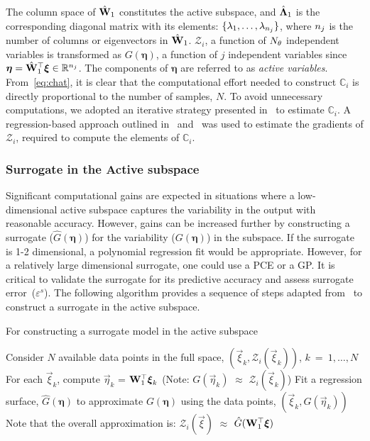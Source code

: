 \ee
%
The column space of $\hat{\mathbf{{W}}}_1$ constitutes the active subspace, and $\hat{\mathbf{{\Lambda}}}_1$ is the 
corresponding diagonal matrix with its elements: $\{\lambda_1,\ldots,\lambda_{n_j}\}$, where ${n_j}$ is the number
of columns or eigenvectors in $\hat{\mathbf{{W}}}_1$. $\mathcal{Z}_{i}$,
a function of ${N_\theta}$ independent variables is transformed as $G(\bm{\eta})$, a function of $j$ independent
variables since $\bm{\eta}=\hat{\mathbf{{W}}}_1^\top \bm{\xi}\in\mathbb{R}^{n_j}$. The components of $\bm{\eta}$
are referred to as \textit{active variables}.
From~\eqref{eq:chat}, it is clear that the computational effort needed to construct $\mathbb{C}_i$ is directly proportional 
to the number of samples, $N$. To avoid unnecessary computations, we adopted an iterative strategy
presented in~\cite{Vohra:2019} to estimate $\mathbb{C}_i$. A regression-based approach outlined
in~\cite{Constantine:2015} and~\cite{Vohra:2019} was used to estimate the gradients of $\mathcal{Z}_{i}$,
required to compute the elements of $\mathbb{C}_i$.

\subsubsection{Surrogate in the Active subspace}
\label{sub:surr}

Significant computational gains are expected in situations where a low-dimensional active subspace captures the
variability in the output with reasonable accuracy. However, gains can be increased further by constructing a 
surrogate ($\hat{G}(\bm{\eta})$) for the variability ($G(\bm{\eta})$) in the subspace. If the surrogate is 1-2 dimensional,
a polynomial regression fit would be appropriate. However, for a relatively large dimensional surrogate, one could
use a PCE or a GP. It is critical to validate the surrogate for its predictive accuracy and assess surrogate 
error~($\varepsilon^s$). 
The following algorithm provides a sequence of steps adapted from~\cite{Constantine:2015} to construct a
surrogate in the active subspace.
%
\begin{breakablealgorithm}
\renewcommand{\algorithmicrequire}{\textbf{Input:}}
\renewcommand{\algorithmicensure}{\textbf{Output:}}
  \caption{For constructing a surrogate model in the active subspace}
  \begin{algorithmic}[1]
	  \State Consider $N$ available data points in the full space, $(\vec\xi_k,\mathcal{Z}_i(\vec\xi_k))$, $k~=~1,\ldots,N$
	  \State For each $\vec\xi_k$, compute $\vec\eta_k$ = $\mat{W}_1^\top\vec\xi_k$ 
          (Note: $G(\vec{\eta}_k)$ $\approx$ $\mathcal{Z}_i(\vec{\xi}_k)$)
	  \State Fit a regression surface, $\hat{G}(\bm{\eta})$ to approximate $G(\bm{\eta})$ using the data
                 points, $(\vec\xi_k,G(\vec\eta_k))$
	  \State Note that the overall approximation is: $\mathcal{Z}_i(\vec{\xi})$ $\approx$
                 $\hat{G}(\mat{W}_1^\top\vec{\xi})$ 
	\EndProcedure
  \end{algorithmic}
  \label{alg:surr}
\end{breakablealgorithm} 
%

